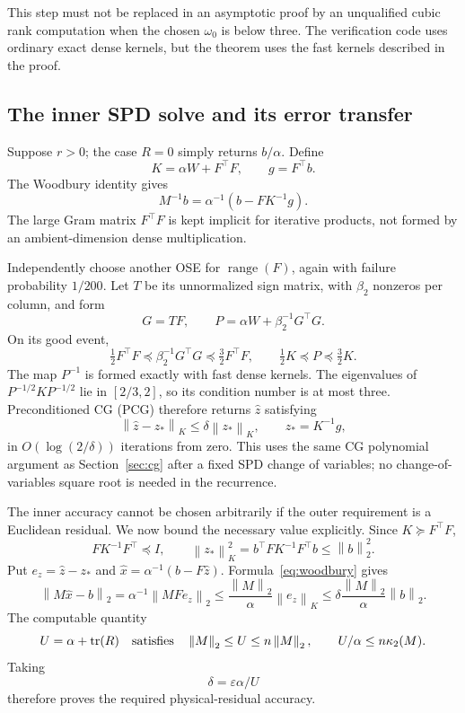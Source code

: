 \documentclass[11pt,a4paper]{article}
\newcommand{\tr}{\operatorname{tr}}
\newcommand{\range}{\operatorname{range}}
\newcommand{\cond}{\kappa_2}
\newcommand{\eps}{\varepsilon}
\newcommand{\norm}[1]{\left\lVert #1\right\rVert}
\theoremstyle{definition}
\theoremstyle{remark}
\begin{document}
This step must not be replaced in an asymptotic proof by an unqualified cubic rank computation when the chosen $\omega_0$ is below three. The verification code uses ordinary exact dense kernels, but the theorem uses the fast kernels described in the proof.

\subsection{The inner SPD solve and its error transfer}
Suppose $r>0$; the case $R=0$ simply returns $b/\alpha$. Define
\begin{equation}
 K=\alpha W+F^\top F,\qquad g=F^\top b. \label{eq:core}
\end{equation}
The Woodbury identity gives
\begin{equation}
 M^{-1}b=\alpha^{-1}(b-FK^{-1}g). \label{eq:woodbury}
\end{equation}
The large Gram matrix $F^\top F$ is kept implicit for iterative products, not formed by an ambient-dimension dense multiplication.

Independently choose another OSE for $\range(F)$, again with failure probability $1/200$. Let $T$ be its unnormalized sign matrix, with $\beta_2$ nonzeros per column, and form
\[
 G=TF,\qquad P=\alpha W+\beta_2^{-1}G^\top G.
\]
On its good event,
\begin{equation}
 \tfrac12F^\top F\preceq\beta_2^{-1}G^\top G\preceq\tfrac32F^\top F,
 \qquad \tfrac12K\preceq P\preceq\tfrac32K. \label{eq:core-sandwich}
\end{equation}
The map $P^{-1}$ is formed exactly with fast dense kernels. The eigenvalues of $P^{-1/2}KP^{-1/2}$ lie in $[2/3,2]$, so its condition number is at most three. Preconditioned CG (PCG) therefore returns $\widehat z$ satisfying
\begin{equation}
 \norm{\widehat z-z_*}_K\le\delta\norm{z_*}_K,
 \qquad z_*=K^{-1}g,
 \label{eq:inner-error}
\end{equation}
in $O(\log(2/\delta))$ iterations from zero. This uses the same CG polynomial argument as Section~\ref{sec:cg} after a fixed SPD change of variables; no change-of-variables square root is needed in the recurrence.

The inner accuracy cannot be chosen arbitrarily if the outer requirement is a Euclidean residual. We now bound the necessary value explicitly. Since $K\succeq F^\top F$,
\[
 FK^{-1}F^\top\preceq I,\qquad
 \norm{z_*}_K^2=b^\top FK^{-1}F^\top b\le\norm b_2^2.
\]
Put $e_z=\widehat z-z_*$ and
$\widehat x=\alpha^{-1}(b-F\widehat z)$. Formula~\eqref{eq:woodbury} gives
\[
 \norm{M\widehat x-b}_2
 =\alpha^{-1}\norm{MF e_z}_2
 \le\frac{\norm M_2}{\alpha}\norm{e_z}_K
 \le\delta\frac{\norm M_2}{\alpha}\norm b_2.
\]
The computable quantity
\begin{equation}
 U=\alpha+\tr(R)
 \quad\hbox{satisfies}\quad
 \norm M_2\le U\le n\norm M_2,
 \qquad U/\alpha\le n\cond(M). \label{eq:U}
\end{equation}
Taking
\begin{equation}
 \delta=\eps\alpha/U \label{eq:inner-delta}
\end{equation}
therefore proves the required physical-residual accuracy.
\end{document}
